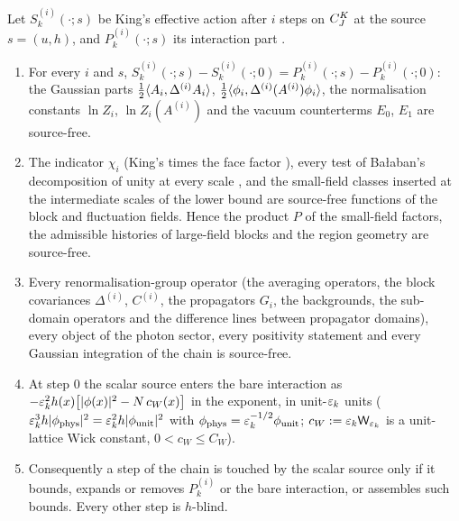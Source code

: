 \begin{lemma}\label{lem:a03:A}
Let $S^{(i)}_k(\cdot;s)$ be King's effective action after $i$ steps on $C^{K}_{J}$ at the source $s=(u,h)$, and $P^{(i)}_k(\cdot;s)$ its interaction part \cite[(3.17)]{K1}.
\begin{enumerate}[label=\textup{(\alph*)},nosep]
\item For every $i$ and $s$, $S^{(i)}_k(\cdot;s)-S^{(i)}_k(\cdot;0)=P^{(i)}_k(\cdot;s)-P^{(i)}_k(\cdot;0)$: the Gaussian parts $\frac12\langle A_i,\Delta^{(i)}A_i\rangle$, $\frac12\langle \phi_i,\Delta^{(i)}(A^{(i)})\phi_i\rangle$, the normalisation constants $\ln Z_i$, $\ln Z_i(A^{(i)})$ and the vacuum counterterms $E_0$, $E_1$ are source-free.
\item The indicator $\chi_i$ (King's \cite[(3.2)]{K1} times the face factor \cite[(5.41)]{K2}), every test of Ba{\l}aban's decomposition of unity at every scale \cite[(2.2)--(2.10)]{Ba2}, and the small-field classes inserted at the intermediate scales of the lower bound \cite[Sect.~3]{Ba1} are source-free functions of the block and fluctuation fields. Hence the product $P$ of the small-field factors, the admissible histories of large-field blocks and the region geometry are source-free.
\item Every renormalisation-group operator (the averaging operators, the block covariances $\Delta^{(i)}$, $C^{(i)}$, the propagators $G_i$, the backgrounds, the sub-domain operators and the difference lines between propagator domains), every object of the photon sector, every positivity statement and every Gaussian integration of the chain is source-free.
\item At step $0$ the scalar source enters the bare interaction as $-\varepsilon_k^2h(x)\big[|\phi(x)|^2-N\,c_W(x)\big]$ in the exponent, in unit-$\varepsilon_k$ units ($\varepsilon_k^3h|\phi_{\mathrm{phys}}|^2=\varepsilon_k^2h|\phi_{\mathrm{unit}}|^2$ with $\phi_{\mathrm{phys}}=\varepsilon_k^{-1/2}\phi_{\mathrm{unit}}$; $c_W:=\varepsilon_k\mathsf W_{\varepsilon_k}$ is a unit-lattice Wick constant, $0<c_W\le C_W$).
\item Consequently a step of the chain is touched by the scalar source only if it bounds, expands or removes $P^{(i)}_k$ or the bare interaction, or assembles such bounds. Every other step is $h$-blind.
\end{enumerate}
\end{lemma}

